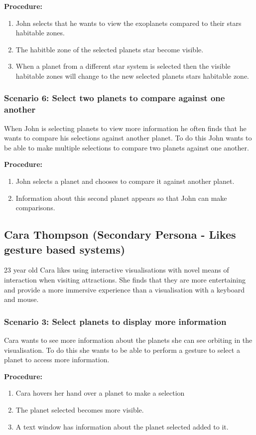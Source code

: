   {\bf  Procedure:}
   \begin{enumerate}
 \item John selects that he wants to view the exoplanets compared to their stars
habitable zones.
 \item The habitble zone of the selected planets star become visible.
 \item When a planet from a different star system is selected then the visible
habitable
zones will change to the new selected planets stars habitable zone.
 \end{enumerate}
 
  \subsubsection{Scenario 6: Select two planets to compare against one another}
When John is selecting planets to view more information he often finds that he
wants to compare his selections against another planet. To do this John wants to
be able to make multiple selections to compare two planets against one another.
  
  {\bf  Procedure:}
   \begin{enumerate}
 \item John selects a planet and chooses to compare it against another planet.
 \item Information about this second planet appears so that John can make
comparisons.
  \end{enumerate}

\subsection{Cara Thompson (Secondary Persona - Likes gesture based systems)}
23 year old Cara likes using interactive visualisations with novel means of
interaction when visiting
attractions. She finds that they are more entertaining and provide a more
immersive experience than a visualisation with a keyboard and mouse. 

 \subsubsection{Scenario 3: Select planets to display more information}
 Cara wants to see more information about the planets she can see
orbiting in the visualisation. To do this she wants to be able to perform a gesture to select a planet to access more information.
 
  {\bf  Procedure:}
   \begin{enumerate}
 \item Cara hovers her hand over a planet to make a selection
 \item The planet selected becomes more
visible.
\item A text window has information about the planet selected added
to it.
 \end{enumerate}
 
